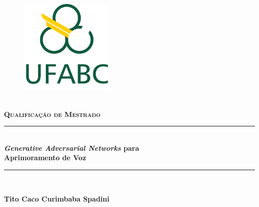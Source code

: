 \begin{titlepage}
		\newcommand{\HRule}{\rule{\linewidth}{0.5mm}}

		\center

		\begin{figure}
			\centering
			\includegraphics[width=0.4\textwidth]{figs/logo_ufabc.png}
		\end{figure}

		\\[0.5cm]
		\textsc{\textbf{\Large Qualificação de Mestrado}}\\[0.5cm] %


		\vspace{1.0cm}

		\HRule \\[0.4cm]
		{ \huge \bfseries \textit{Generative Adversarial Networks} para \\[0.5cm] Aprimoramento de Voz}\\[0.25cm] %
		\HRule \\[1.0cm]

		\vspace{0.5cm}


		\vspace{1.0cm}

		\textbf{\LARGE Tito Caco Curimbaba Spadini}\\[1.0cm]


\end{titlepage}
